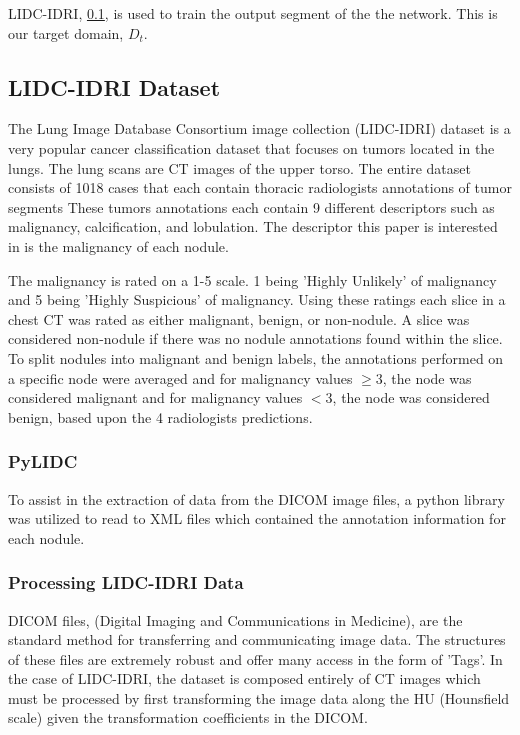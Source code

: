 \documentclass[10pt,twocolumn,letterpaper]{article}
\begin{document}
   LIDC-IDRI, \ref{sec:data-lidc}, is used to train the output segment of the
   the network. This is our target domain, $D_t$.

   \subsection{LIDC-IDRI Dataset} \label{sec:data-lidc}
      The Lung Image Database Consortium image collection (LIDC-IDRI) dataset
      is a very popular cancer classification dataset that focuses on tumors located
      in the lungs. The lung scans are CT images of the upper torso. The entire dataset
      consists of 1018 cases that each contain thoracic radiologists annotations of tumor segments
      These tumors annotations each contain 9 different descriptors such as malignancy,
      calcification, and lobulation. The descriptor this paper is interested in is the
      malignancy of each nodule.

      The malignancy is rated on a 1-5 scale. 1 being 'Highly Unlikely' of malignancy and
      5 being 'Highly Suspicious' of malignancy. Using these ratings each slice in a chest CT
      was rated as either malignant, benign, or non-nodule. A slice was considered non-nodule
      if there was no nodule annotations found within the slice. To split nodules into malignant
      and benign labels, the annotations performed on a specific node were averaged and for malignancy
      values $\ge 3$, the node was considered malignant and for malignancy values $< 3$, the node was
      considered benign, based upon the 4 radiologists predictions.

      \subsubsection{PyLIDC} \label{sec:data-lidc-pylidc}
         To assist in the extraction of data from the DICOM image files, a python library was utilized
         to read to XML files which contained the annotation information for each nodule. \cite{Hancock2018}

      \subsubsection{Processing LIDC-IDRI Data} \label{sec:data-lidc-processing}
         DICOM files, (Digital Imaging and Communications in Medicine), are the standard method for transferring
         and communicating image data. The structures of these files are extremely robust and offer many access in
         the form of 'Tags'. In the case of LIDC-IDRI, the dataset is composed entirely of CT images which must be
         processed by first transforming the image data along the HU (Hounsfield scale) given the transformation
         coefficients in the DICOM.
\end{document}
